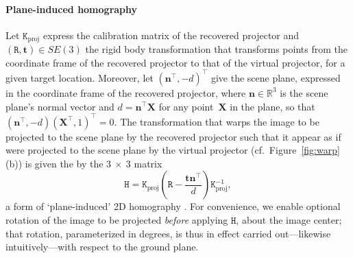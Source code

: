 \documentclass[review]{elsarticle}
\begin{document}
\paragraph{Plane-induced homography} Let $\mathtt{K}_\text{proj}$ express the calibration matrix of the recovered projector and $(\mathtt{R}, \mathbf{t}) \in SE(3)$ the rigid body transformation that transforms points from the coordinate frame of the recovered projector to that of the virtual projector, for a given target location. Moreover, let $(\mathbf{n}^\top, -d)^\top$ give the scene plane, expressed in the coordinate frame of the recovered projector, where $\mathbf{n} \in \mathbb{R}^3$ is the scene plane's normal vector and $d = \mathbf{n}^\top\mathbf{X}$ for any point~$\mathbf{X}$ in the plane, so that $(\mathbf{n}^\top, -d) (\mathbf{X}^\top, 1)^\top = 0$. The transformation that warps the image to be projected to the scene plane by the recovered projector such that it appear as if were projected to the scene plane by the virtual projector (cf.\ Figure~\ref{fig:warp}(b)) is given the by the $3~\times~3$ matrix
\begin{equation}
\mathtt{H} = \mathtt{K}_\text{proj}\left(\mathtt{R} - \frac{\mathbf{t}\mathbf{n}^\top}{d}\right)\mathtt{K}_\text{proj}^{-1},
\label{homgen}
\end{equation}
a form of `plane-induced' 2D homography \cite{Hartley2004}. For convenience, we enable optional rotation of the image to be projected \textit{before} applying $\mathtt{H}$, about the image center; that rotation, parameterized in degrees, is thus in effect carried out---likewise intuitively---with respect to the ground plane.
\end{document}
